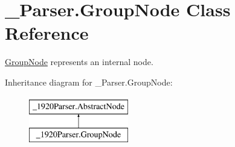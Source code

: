 \hypertarget{class__1920_parser_1_1_group_node}{}\section{\+\_\+Parser.\+Group\+Node Class Reference}
\label{class__1920_parser_1_1_group_node}


\hyperlink{class__1920_parser_1_1_group_node}{Group\+Node} represents an internal node.  


Inheritance diagram for \+\_\+Parser.\+Group\+Node\+:\begin{figure}[H]
\begin{center}
\leavevmode
\includegraphics[height=2.000000cm]{class__1920_parser_1_1_group_node}
\end{center}
\end{figure}
